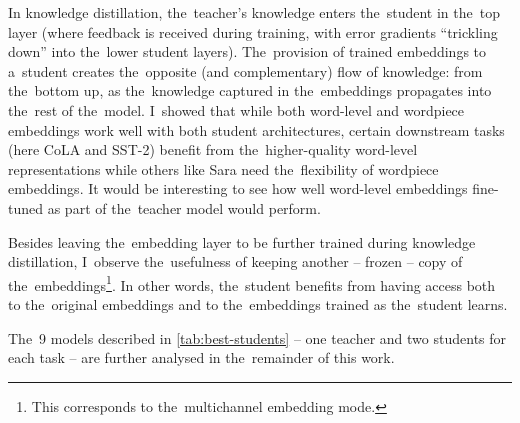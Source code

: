 \documentclass[bsc,frontabs,singlespacing,parskip,deptreport]{infthesis}
\begin{document}
{{    In knowledge distillation, the~teacher's knowledge enters the~student in the~top layer (where feedback is received during training, with error gradients ``trickling down'' into the~lower student layers).
    The~provision of trained embeddings to a~student creates the~opposite (and complementary) flow of knowledge: from the~bottom up, as the~knowledge captured in the~embeddings propagates into the~rest of the~model.
    I~showed that while both word-level and wordpiece embeddings work well with both student architectures, certain downstream tasks (here CoLA and SST-2) benefit from the~higher-quality word-level representations while others like Sara need the~flexibility of wordpiece embeddings.
    It would be interesting to see how well word-level embeddings fine-tuned as part of the~teacher model would perform.

    Besides leaving the~embedding layer to be further trained during knowledge distillation, I~observe the~usefulness of keeping another -- frozen -- copy of the~embeddings\footnote{This corresponds to the~multichannel embedding mode.}. In other words, the~student benefits from having access both to the~original embeddings and to the~embeddings trained as the~student learns.

    The~9 models described in \autoref{tab:best-students} -- one teacher and two students for each task -- are further analysed in the~remainder of this work.
  }
}
\end{document}
